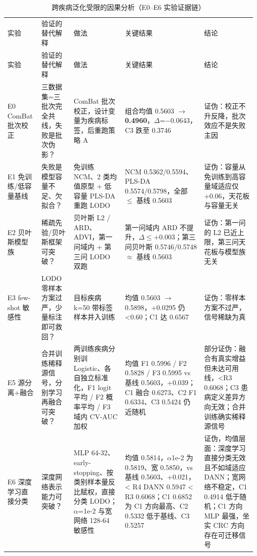 \documentclass{../../latex/templates/mcm-paper}
\begin{document}
{\scriptsize
\begin{longtable}{>{\centering\arraybackslash}p{}>{\centering\arraybackslash}p{}>{\centering\arraybackslash}p{}>{\centering\arraybackslash}p{}>{\centering\arraybackslash}p{}}
\arrayrulecolor[gray]{0.8}
\caption{跨疾病泛化受限的因果分析（E0--E6 实验证据链）}\label{tab:s3-evidence}\\
\toprule
实验 & 验证的替代解释 & 做法 & 关键结果 & 结论 \\
\midrule
\endfirsthead
\toprule
实验 & 验证的替代解释 & 做法 & 关键结果 & 结论 \\
\midrule
\endhead
\bottomrule
\endlastfoot
E0 ComBat 批次校正 & 三数据集=三批次完全共线，失败是批次伪影？ & ComBat 批次校正，设计变量为疾病标签，后重跑策略 A & 3 组合均值 0.5603 $\to$ \textbf{0.4960}，$\Delta$=$-$0.0643，C3 跌至 0.3746 & 证伪：校正不升反降，批次效应不是失败主因 \\
\hline
E1 免训练/低容量基线 & 失败是模型容量不足、欠拟合？ & 免训练 NCM、2 类均值原型 + 低容量 PLS-DA 重跑 LODO & NCM 0.5362/0.5594、PLS-DA 0.5574/0.5798，全部 $\le$ 基线 0.5603 & 证伪：容量从免训练到高容量域适应仅 +0.06，天花板与容量无关 \\
\hline
E2 贝叶斯模型族 & 稀疏先验/贝叶斯框架可突破？ & 贝叶斯 L2 / ARD、ADVI，第一问域内 + 第三问 LODO 双跑 & 第一问域内 ARD 不提升，$\Delta\le+0.003$；第三问贝叶斯 0.5746/0.5748 $\approx$ 基线 0.5603 & 证伪：第一问的 L2 已近上限，第三问天花板与模型族无关 \\
\hline
E3 few-shot 敏感性 & LODO 零样本方案过严，少量标注即可救回？ & 目标疾病 k=50 带标签样本并入训练 & 均值 0.5603 $\to$ 0.5898，+0.0295 仍 <0.60；C1 达 0.6567 & 证伪：零样本方案不过严，信号稀缺为真 \\
\hline
E5 源分离+融合 & 合并训练稀释源信号，分别学习再融合可突破？ & 两训练疾病分别训 Logistic、各自独立标准化，F1 logit 平均 / F2 概率平均 / F3 域内 CV-AUC 加权 & 均值 F1 0.5996 / F2 0.5828 / F3 0.5995 vs 基线 0.5603，+0.039；C1 融合 0.6273、C2 F1 0.6334、C3 0.5424 仍近随机 & 部分证伪：融合有真实增益但未达可用线，<R3 0.6068；C3 患病定义差异方向无效；合并训练确实稀释源信号 \\
\hline
E6 深度学习直接分类 & 深度网络表示能力可突破？ & MLP 64-32、early-stopping、按类别样本量反比赋权，直接分类 LODO；$\alpha$=1e-2 与宽网络 128-64 敏感性 & 均值 0.5814，$\alpha$1e-2 为 0.5819、宽 0.5850，vs 基线 0.5603、+0.021，< R4 DANN 0.5947 < R3 0.6068；C1 0.6852 为 C1 方向最高、C2 0.5332 低于基线、C3 0.5257 & 证伪，均值层面：深度学习直接分类无效且不如域适应 DANN；宽网络不稳定，C1 0.4914 低于随机；C1 方向 MLP 最强，坐实 CRC 方向存在可迁移信号 \\
\end{longtable}
}
\end{document}
